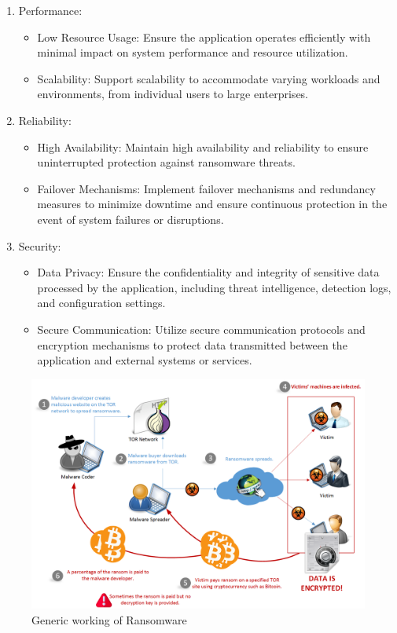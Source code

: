 \documentclass[12pt,twocolumn]{article}
\begin{document}
\begin{enumerate}
    \item Performance:

        \begin{itemize}
            \item Low Resource Usage: Ensure the application operates efficiently with minimal impact on system performance and resource utilization.

            \item Scalability: Support scalability to accommodate varying workloads and environments, from individual users to large enterprises.
        \end{itemize}
    \item Reliability:
        \begin{itemize}
            \item High Availability: Maintain high availability and reliability to ensure uninterrupted protection against ransomware threats.

            \item Failover Mechanisms: Implement failover mechanisms and redundancy measures to minimize downtime and ensure continuous protection in the event of system failures or disruptions.
        \end{itemize}


    \item Security:
    \begin{itemize}
            \item Data Privacy: Ensure the confidentiality and integrity of sensitive data processed by the application, including threat intelligence, detection logs, and configuration settings.

            \item Secure Communication: Utilize secure communication protocols and encryption mechanisms to protect data transmitted between the application and external systems or services.
    \end{itemize}
\end{enumerate}

\begin{figure}[ht]
  \includegraphics[width=\textwidth, height= 8 cm]{20180214-Free-Ransomware-1.png} %
  \caption{Generic working of Ransomware}
  \label{fig:my_label}
\end{figure}
\end{document}
